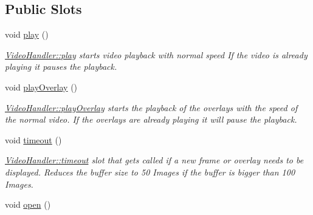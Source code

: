 \subsection*{Public Slots}
\begin{DoxyCompactItemize}
\item 
void \hyperlink{classVideoHandler_a453238d48cf43f92da176366e0aace6f}{play} ()\hypertarget{classVideoHandler_a453238d48cf43f92da176366e0aace6f}{}\label{classVideoHandler_a453238d48cf43f92da176366e0aace6f}

\begin{DoxyCompactList}\small\item\em \hyperlink{classVideoHandler_a453238d48cf43f92da176366e0aace6f}{Video\+Handler\+::play} starts video playback with normal speed If the video is already playing it pauses the playback. \end{DoxyCompactList}\item 
void \hyperlink{classVideoHandler_a7e80d78cb9c2514a2b19c285ddcdd42d}{play\+Overlay} ()\hypertarget{classVideoHandler_a7e80d78cb9c2514a2b19c285ddcdd42d}{}\label{classVideoHandler_a7e80d78cb9c2514a2b19c285ddcdd42d}

\begin{DoxyCompactList}\small\item\em \hyperlink{classVideoHandler_a7e80d78cb9c2514a2b19c285ddcdd42d}{Video\+Handler\+::play\+Overlay} starts the playback of the overlays with the speed of the normal video. If the overlays are already playing it will pause the playback. \end{DoxyCompactList}\item 
void \hyperlink{classVideoHandler_af9c6426d96227ffd38c0b7db6aaf037d}{timeout} ()\hypertarget{classVideoHandler_af9c6426d96227ffd38c0b7db6aaf037d}{}\label{classVideoHandler_af9c6426d96227ffd38c0b7db6aaf037d}

\begin{DoxyCompactList}\small\item\em \hyperlink{classVideoHandler_af9c6426d96227ffd38c0b7db6aaf037d}{Video\+Handler\+::timeout} slot that gets called if a new frame or overlay needs to be displayed. Reduces the buffer size to 50 Images if the buffer is bigger than 100 Images. \end{DoxyCompactList}\item 
void \hyperlink{classVideoHandler_aaa4f41896e565606552d960951145ca5}{open} ()\hypertarget{classVideoHandler_aaa4f41896e565606552d960951145ca5}{}\label{classVideoHandler_aaa4f41896e565606552d960951145ca5}


\end{DoxyCompactItemize}
